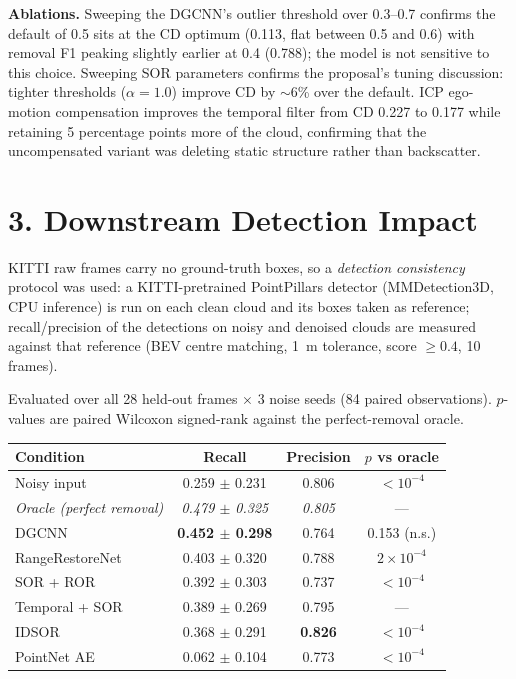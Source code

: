 \documentclass[12pt,a4paper]{article}
\begin{document}
\textbf{Ablations.} Sweeping the DGCNN's outlier threshold over
0.3--0.7 confirms the default of 0.5 sits at the CD optimum (0.113, flat
between 0.5 and 0.6) with removal F1 peaking slightly earlier at 0.4
(0.788); the model is not sensitive to this choice. Sweeping SOR parameters
confirms the proposal's tuning discussion: tighter thresholds
($\alpha=1.0$) improve CD by $\sim$6\% over the default. ICP ego-motion
compensation improves the temporal filter from CD 0.227 to 0.177 while
retaining 5 percentage points more of the cloud, confirming that the
uncompensated variant was deleting static structure rather than
backscatter.

\section*{3. Downstream Detection Impact}

KITTI raw frames carry no ground-truth boxes, so a \emph{detection
consistency} protocol was used: a KITTI-pretrained PointPillars detector
(MMDetection3D, CPU inference) is run on each clean cloud and its boxes
taken as reference; recall/precision of the detections on noisy and denoised
clouds are measured against that reference (BEV centre matching, 1~m
tolerance, score $\geq 0.4$, 10 frames).

Evaluated over all 28 held-out frames $\times$ 3 noise seeds (84 paired
observations). $p$-values are paired Wilcoxon signed-rank against the
perfect-removal oracle.

\begin{table}[h]
\centering\small
\begin{tabular}{lccc}
\toprule
\textbf{Condition} & \textbf{Recall} & \textbf{Precision} & \textbf{$p$ vs oracle}\\
\midrule
Noisy input & 0.259 $\pm$ 0.231 & 0.806 & $<10^{-4}$\\
\emph{Oracle (perfect removal)} & \emph{0.479 $\pm$ 0.325} & \emph{0.805} & ---\\
DGCNN       & \textbf{0.452 $\pm$ 0.298} & 0.764 & 0.153 (n.s.)\\
RangeRestoreNet & 0.403 $\pm$ 0.320 & 0.788 & $2\times10^{-4}$\\
SOR + ROR   & 0.392 $\pm$ 0.303 & 0.737 & $<10^{-4}$\\
Temporal + SOR & 0.389 $\pm$ 0.269 & 0.795 & ---\\
IDSOR       & 0.368 $\pm$ 0.291 & \textbf{0.826} & $<10^{-4}$\\
PointNet AE & 0.062 $\pm$ 0.104 & 0.773 & $<10^{-4}$\\
\bottomrule
\end{tabular}
\end{table}
\end{document}
